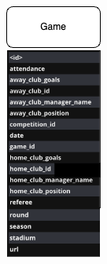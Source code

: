 \documentclass{Configuration_Files/PoliMi3i_thesis}
\begin{document}
\begin{figure}[htbp]
\begin{subfigure}[b]{0.2\linewidth}
  \end{subfigure}
  \hfill
  \begin{subfigure}[b]{0.23\linewidth}
    \includegraphics[width=\linewidth]{Project Template/Images/entities/game.drawio.png}

\end{subfigure}
\end{figure}
\end{document}
